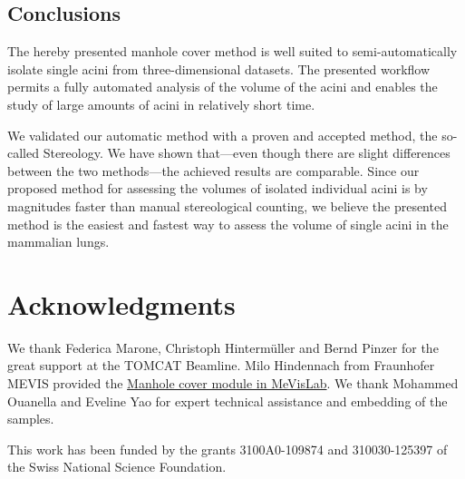 \documentclass[%
	twoside,
	paper=a4,%
	abstract=true,%
	]{scrartcl}
\begin{document}
\subsection{Conclusions}
The hereby presented manhole cover method is well suited to semi-automatically isolate single acini from three-dimensional datasets. The presented workflow permits a fully automated analysis of the volume of the acini and enables the study of large amounts of acini in relatively short time.

We validated our automatic method with a proven and accepted method, the so-called Stereology. We have shown that---even though there are slight differences between the two methods---the achieved results are comparable. Since our proposed method for assessing the volumes of isolated individual acini is by magnitudes faster than manual stereological counting, we believe the presented method is the easiest and fastest way to assess the volume of single acini in the mammalian lungs.

\clearpage
\section{Acknowledgments}
We thank Federica Marone, Christoph Hintermüller and Bernd Pinzer for the great support at the TOMCAT Beamline. Milo Hindennach from Fraunhofer MEVIS provided the \href{http://www.mevis-research.de/cgi-bin/discus/board-auth.cgi?lm=1282233250&file=/839/11760.html}{Manhole cover module in MeVisLab}. We thank Mohammed Ouanella and Eveline Yao for expert technical assistance and embedding of the samples.

This work has been funded by the grants 3100A0-109874 and 310030-125397 of the Swiss National Science Foundation.

\clearpage
\singlespacing


\end{document}
